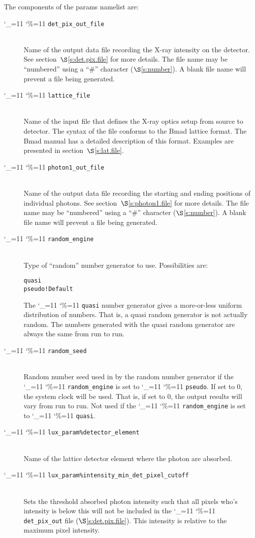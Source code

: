 \documentclass[11pt]{article}
\newcommand\ttcmd{\begingroup\catcode`\_=11 \catcode`\%=11 \dottcmd}
\newcommand\dottcmd[1]{\texttt{#1}\endgroup}
\newcommand{\vn}{\ttcmd}
\newcommand{\Newline}{\hfil \\}
\newcommand{\sref}[1]{$\S$\ref{#1}}
\newenvironment{example}
  {\vspace{\ExBeg} \begin{alltt}}
  {\end{alltt} \vspace{\ExEnd}}
\newlength{\ExBeg}
\newlength{\ExEnd}
\begin{document}
The components of the params namelist are:
  \begin{description}
  \item[\vn{det_pix_out_file}] \Newline
Name of the output data file recording the X-ray intensity on the
detector. See section~\sref{s:det.pix.file} for more details. The file
name may be ``numbered'' using a ``\#'' character (\sref{s:number}). A
blank file name will prevent a file being generated.

  \item[\vn{lattice_file}] \Newline
Name of the input file that defines the X-ray optics setup from source
to detector. The syntax of the file conforms to the Bmad lattice
format. The Bmad manual has a detailed description of this format.
Examples are presented in section~\sref{s:lat.file}.

  \item[\vn{photon1_out_file}] \Newline
Name of the output data file recording the starting and ending
positions of individual photons. See section~\sref{s:photon1.file} for
more details. The file name may be ``numbered'' using 
a ``\#'' character (\sref{s:number}). A blank file name will prevent a
file being generated.

  \item[\vn{random_engine}] \Newline
Type of ``random'' number generator to use. Possibilities are:
\begin{example}
  quasi      
  pseudo      ! Default
\end{example}
The \vn{quasi} number generator gives a more-or-less uniform
distribution of numbers. That is, a quasi random generator is not
actually random. The numbers generated with the quasi random generator
are always the same from run to run.

  \item[\vn{random_seed}] \Newline
Random number seed used in by the random number generator if the
\vn{random_engine} is set to \vn{pseudo}. If set to 0, the system
clock will be used. That is, if set to 0, the output results will vary
from run to run. Not used if the \vn{random_engine} is set to \vn{quasi}.

  \item[\vn{lux_param\%detector_element}] \Newline
Name of the lattice detector element where the photon are absorbed.

  \item[\vn{lux_param\%intensity_min_det_pixel_cutoff}] \Newline
Sets the threshold absorbed photon intensity such that all pixels
who's intensity is below this will not be included in the
\vn{det_pix_out} file (\sref{s:det.pix.file}). This intensity is
relative to the maximum pixel intensity. 


\end{description}
\end{document}
